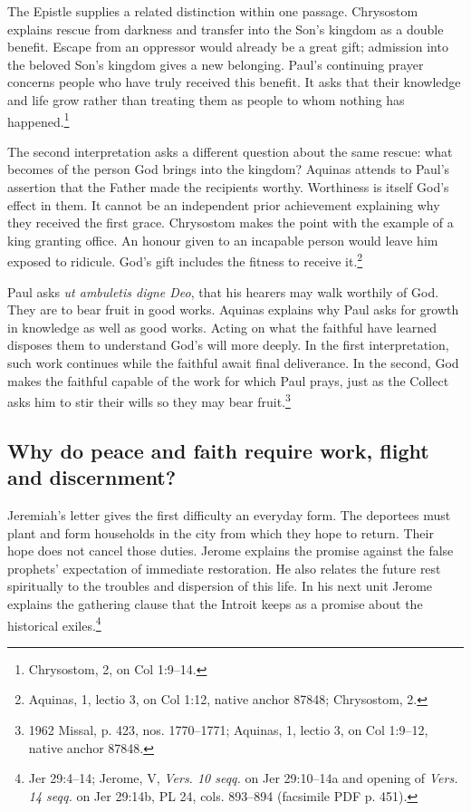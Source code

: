 The Epistle supplies a related distinction within one passage. Chrysostom
explains rescue from darkness and transfer into the Son's kingdom as a
double benefit. Escape from an oppressor would already be a great gift;
admission into the beloved Son's kingdom gives a new belonging. Paul's
continuing prayer concerns people who have truly received this benefit.
It asks that their knowledge and life grow rather than treating them as
people to whom nothing has happened.\footnote{Chrysostom,
 2, on Col 1:9--14.}

The second interpretation asks a different question about the same rescue:
what becomes of the person God brings into the kingdom? Aquinas attends to
Paul's assertion that the Father made the recipients worthy. Worthiness is
itself God's effect in them. It cannot be an independent prior achievement
explaining why they received the first grace. Chrysostom makes the point
with the example of a king granting office. An honour given to an incapable
person would leave him exposed to ridicule. God's gift includes the fitness
to receive it.\footnote{Aquinas,  1, lectio 3,
on Col 1:12, native anchor 87848; Chrysostom, 
2.}

Paul asks \textit{ut ambuletis digne Deo}, that his hearers may walk
worthily of God. They are to bear fruit in good
works. Aquinas explains why Paul asks for growth in knowledge as well
as good works. Acting on what the faithful have learned disposes them
to understand God's will more deeply. In the first interpretation,
such work continues while the faithful await final deliverance. In
the second, God makes the faithful capable of the work for which Paul
prays, just as the Collect asks him to stir their wills so they may
bear fruit.\footnote{1962 Missal, p. 423, nos. 1770--1771; Aquinas,
 1, lectio 3, on Col 1:9--12, native anchor
87848.}

\subsection{Why do peace and faith require work, flight and discernment?}

Jeremiah's letter gives the first difficulty an everyday form. The
deportees must plant and form households in the city from which they hope
to return. Their hope does not cancel those duties. Jerome explains the
promise against the false prophets' expectation of immediate restoration.
He also relates the future rest spiritually to the troubles and dispersion
of this life. In his next unit Jerome explains the gathering clause
that the Introit keeps as a promise about the historical exiles.\footnote{Jer
29:4--14; Jerome,  V,
\textit{Vers. 10 seqq.} on Jer 29:10--14a and opening of
\textit{Vers. 14 seqq.} on Jer 29:14b, PL 24, cols. 893--894
(facsimile PDF p. 451).}

